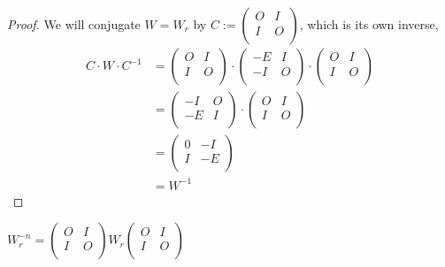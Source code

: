 \begin{proof}
  We will conjugate $W=W_{r}$ by
  $C := \left(\begin{smallmatrix} O & I \\ I & O \\\end{smallmatrix}\right)$,
  which is its own inverse,
  \[
  \begin{aligned}
  C \cdot W \cdot C^{-1}
  & =
  \left(
  \begin{array}{cc}
    O & I \\
    I & O \\
  \end{array}
  \right)
  \cdot
  \left(
  \begin{array}{cc}
    -E & I \\
    -I & O \\
  \end{array}
  \right)
  \cdot
  \left(
  \begin{array}{cc}
    O & I \\
    I & O \\
  \end{array}
  \right) \\
  & =
  \left(
  \begin{array}{cc}
    -I & O \\
    -E & I \\
  \end{array}
  \right)
  \cdot
  \left(
  \begin{array}{cc}
    O & I \\
    I & O \\
  \end{array}
  \right) \\
  & =
  \left(
  \begin{array}{cc}
    0 & -I \\
    I & -E \\
  \end{array}
  \right) \\
  & =
  W^{-1}
  \end{aligned}
  \]
\end{proof}

\begin{corollary}
  $W_r^{-n} =
  \left(\begin{smallmatrix} O & I \\ I & O \\\end{smallmatrix}\right)
  W_r
  \left(\begin{smallmatrix} O & I \\ I & O \\\end{smallmatrix}\right)$
\end{corollary}

